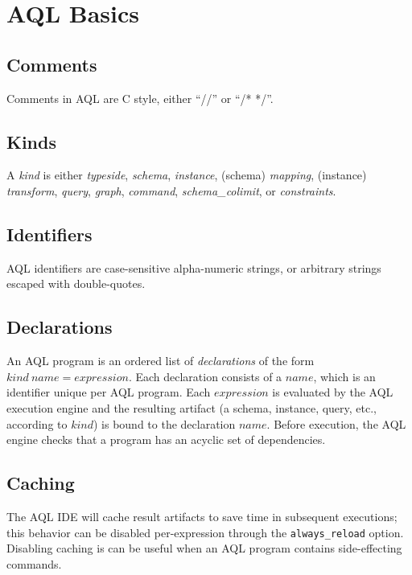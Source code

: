 \documentclass[10pt]{book}
\begin{document}
\chapter{AQL Basics}

\section{Comments}

Comments in AQL are C style, either ``//'' or ``/* */''.  

\section{Kinds}

A {\it kind} is either {\it typeside}, {\it schema},  {\it instance}, (schema) {\it  mapping}, (instance) {\it transform}, {\it query}, {\it graph},  {\it command}, {\it schema\_colimit}, or {\it constraints}. 

\section{Identifiers}

AQL identifiers are case-sensitive alpha-numeric strings, or arbitrary strings escaped with double-quotes.

\section{Declarations}

An AQL program is an ordered list of {\it declarations} of the form $kind \ name = expression$.  Each declaration consists of a $name$, which is an   identifier unique per AQL program. Each $expression$ is evaluated by the AQL execution engine and the resulting artifact (a schema, instance, query, etc., according to $kind$) is bound to the declaration $name$.  Before execution, the AQL engine checks that a program has an acyclic set of dependencies.

\section{Caching}

The AQL IDE will cache result artifacts to save time in subsequent executions; this behavior can be disabled per-expression through the {\tt always\_reload} option.  Disabling caching is can be useful when an AQL program contains side-effecting commands.
\end{document}
